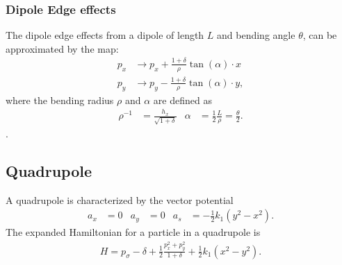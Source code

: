 \documentclass[english]{article}
\begin{document}
\subsubsection{Dipole Edge effects}
The dipole edge effects from a dipole of length $L$ and bending
angle $\theta$, can be approximated by the map:
\begin{align}
    p_x &\to p_x + \frac{1+\delta}{\rho} \tan(\alpha) \cdot x \\
    p_y &\to p_y - \frac{1+\delta}{\rho} \tan(\alpha) \cdot y,
\end{align}
where the bending radius $\rho$ and $\alpha$ are defined as
\begin{align}
    \rho^{-1}   &= \frac{h_x}{\sqrt{1+\delta}} &
    \alpha &= \frac{1}{2} \frac{L}{\rho} = \frac{\theta}{2}.
\end{align}.


\subsection{Quadrupole}

A quadrupole is characterized by the vector potential
\begin{align}
  a_x & = 0  & a_y & = 0 & a_s & = -\frac{1}{2}k_1(y^2 - x^2).
\end{align}
The expanded Hamiltonian for a particle in a quadrupole is
\begin{align}
  H =  p_\sigma -\delta + \frac{1}{2}\frac{p_x^2+p_y^2}{1+\delta}        %
  + \frac{1}{2}k_1(x^2 - y^2).
\end{align}
\end{document}
